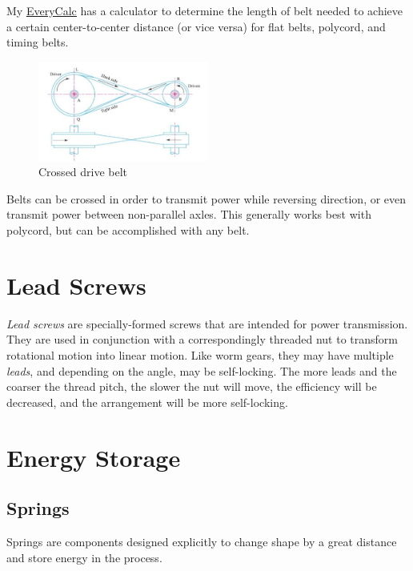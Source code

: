 My \href{http://thaddeus-maximus.github.io/swissarmyengineer/}{\color{red}\underline{EveryCalc}} has a calculator to determine the length of belt needed to achieve a certain center-to-center distance (or vice versa) for flat belts, polycord, and timing belts.

\begin{figure}[H]
	\includegraphics[width=0.5\textwidth]{imgs/belt_crossed.png}
	\caption{Crossed drive belt}
\end{figure}
	Belts can be crossed in order to transmit power while reversing direction, or even transmit power between non-parallel axles. This generally works best with polycord, but can be accomplished with any belt.
	
\section{Lead Screws}

\textit{Lead screws} are specially-formed screws that are intended for power transmission. They are used in conjunction with a correspondingly threaded nut to transform rotational motion into linear motion. Like worm gears, they may have multiple \textit{leads}, and depending on the angle, may be self-locking. The more leads and the coarser the thread pitch, the slower the nut will move, the efficiency will be decreased, and the arrangement will be more self-locking.

	
\section{Energy Storage} \label{sec:energy_storage}

\subsection{Springs} \label{subsec:springs} 
	Springs are components designed explicitly to change shape by a great distance and store energy in the process.
	
